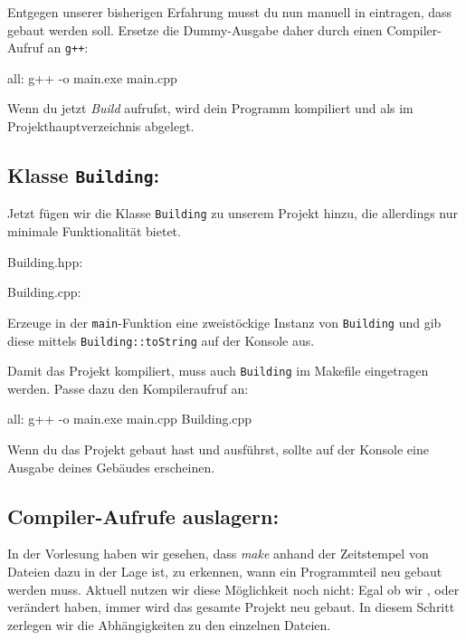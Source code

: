 Entgegen unserer bisherigen Erfahrung musst du nun manuell in  eintragen, dass  gebaut werden soll.
Ersetze die Dummy-Ausgabe daher durch einen Compiler-Aufruf an \texttt{g++}:
\begin{lstmake}
all:
    g++ -o main.exe main.cpp
\end{lstmake}

Wenn du jetzt \emph{Build} aufrufst, wird dein Programm kompiliert und als  im Projekthauptverzeichnis abgelegt.

\subsection{Klasse \lstinline{Building}:}
Jetzt fügen wir die Klasse \lstinline{Building} zu unserem Projekt hinzu, die allerdings nur minimale Funktionalität bietet.

Building.hpp:
\begin{minipage}[t]{.45\textwidth}

\end{minipage}

Building.cpp:
\begin{minipage}[t]{.5\textwidth}

\end{minipage}

Erzeuge in der \lstinline{main}-Funktion eine zweistöckige Instanz von \lstinline{Building} und gib diese mittels \lstinline{Building::toString} auf der Konsole aus.

Damit das Projekt kompiliert, muss auch \lstinline{Building} im Makefile eingetragen werden.
Passe dazu den Kompileraufruf an:
\begin{lstmake}
all:
    g++ -o main.exe main.cpp Building.cpp
\end{lstmake}

Wenn du das Projekt gebaut hast und ausführst, sollte auf der Konsole eine Ausgabe deines Gebäudes erscheinen.

\subsection{Compiler-Aufrufe auslagern:}
In der Vorlesung haben wir gesehen, dass \emph{make} anhand der Zeitstempel von Dateien dazu in der Lage ist, zu erkennen, wann ein Programmteil neu gebaut werden muss.
Aktuell nutzen wir diese Möglichkeit noch nicht:
Egal ob wir ,  oder  verändert haben, immer wird das gesamte Projekt neu gebaut.
In diesem Schritt zerlegen wir die Abhängigkeiten zu den einzelnen Dateien.


